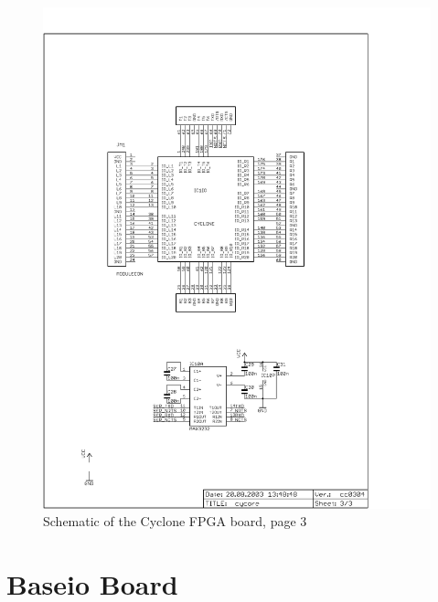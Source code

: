 \begin{figure}
    \centering
    \includegraphics[scale=0.68]{appendix/cycore_p3}
    \caption{Schematic of the Cyclone FPGA board, page 3}
\end{figure}

\newpage
\section{Baseio Board} \label{appx:baseio}

